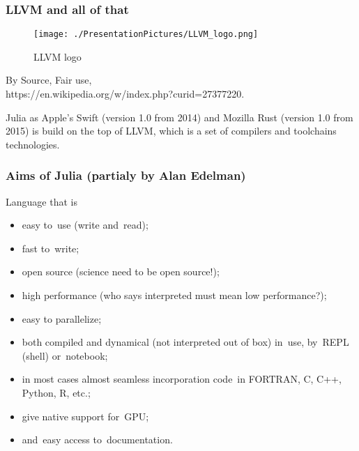 \documentclass[10pt,t]{beamer}
\begin{document}
\begin{frame}
  \frametitle{LLVM and all of that}


  \begin{figure}

    \texttt{[image: ./PresentationPictures/LLVM\_logo.png]}


    \caption{LLVM logo}

  \end{figure}


  By Source, Fair use, \\
  {https://en.wikipedia.org/w/index.php?curid=27377220}.


  Julia as Apple's Swift (version 1.0 from 2014) and Mozilla Rust
  (version 1.0 from 2015) is build on the top of LLVM, which is a set
  of compilers and toolchains technologies.

\end{frame}





\begin{frame}
  \frametitle{Aims of Julia (partialy by Alan Edelman)}


  Language that is
  \begin{itemize}
    \RaggedRight

  \item easy to~use (write and~read);

  \item fast to~write;

  \item open source (science need to be open source!);

  \item high performance (who says interpreted must mean low
    performance?);

  \item easy to parallelize;

  \item both compiled and dynamical (not interpreted out of box)
    in~use, by~REPL (shell) or~notebook;

  \item in most cases almost seamless incorporation code~in FORTRAN,
    C, C++, Python, R, etc.;

  \item give native support for~GPU;

  \item and~easy access to~documentation.

  \end{itemize}

\end{frame}
\end{document}
